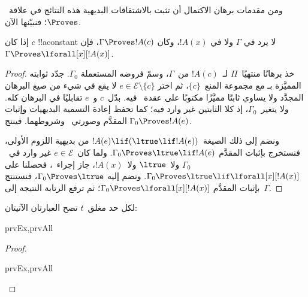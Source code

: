 \documentclass[../../../include/open-logic-section]{subfiles}
\begin{document}


\begin{explain}
  ومن مقدمات برهان الاكتمال أن تثبت بالاشتقاقات البديهية هذه
  النتائج في علاقة~$\Proves$؛ فنبيّنها الآن.
\end{explain}

\begin{thm}
 إذا كان $c$ !!a{constant} لا يرد
في $\Gamma$ ولا في $!A(x)$، وكان $\Gamma \Proves !A(c)$، فإن $\Gamma
\Proves \lforall[x][!A(x)]$.
\end{thm}

\begin{proof}
خذ برهانًا منتهيًا~$\Pi$ لـ~$!A(c)$ من~$\Gamma$، وسمّ فروضه المستعملة
$\Gamma_0$. جدّد ثوابته المميَّزة بـ
   مع مجموعة المنع~$\{c\}$، ثم اختر
$e\in\mathcal E\setminus\{c\}$ لا يقع في شيء من صيغ البرهان المجدَّد ولا يساوي ثابتًا
مميَّزًا مكتوبًا على عقدة~\QR{} فيه. بدّل~$c$ و~$e$ تقابليًا في البرهان
كله. ولا يتغير~$\Gamma_0$، إذ كلا الثابتين غير وارد فيه؛ كما تحفظ إعادة
التسمية البديهيات وإثبات المقدَّم وصورتي~\QR{} وشروطهما. فينتج
$\Gamma_0\Proves !A(e)$.

  ونضم إلى ذلك الصيغة~$!A(e)\lif(\ltrue\lif !A(e))$ من بديهية اللزوم
  الأولى، فنستخرج بإثبات المقدَّم
  $\Gamma_0\Proves\ltrue\lif !A(e)$. ولما كان~$e\in\mathcal E$ غير وارد
في~$\Gamma_0$ ولا~$\ltrue$ ولا~$!A(x)$، جاز إجراء~\QR{}، فحصلنا على
$\Gamma_0\Proves\ltrue\lif\lforall[x][!A(x)]$. ونضم إليه
$\Gamma_0\Proves\ltrue$، فنستنتج بإثبات المقدَّم
$\Gamma_0\Proves\lforall[x][!A(x)]$؛ ثم ترفع الرتابة النتيجة إلى~$\Gamma$.
\end{proof}

\begin{prop}
لكل حد مغلق~$t$ تصح العبارتان الآتيتان:
\begin{tagenumerate}{prvEx,prvAll}

\end{tagenumerate}
\end{prop}

\begin{proof}
\begin{tagenumerate}{prvEx,prvAll}
\end{tagenumerate}
\end{proof}
\end{document}
